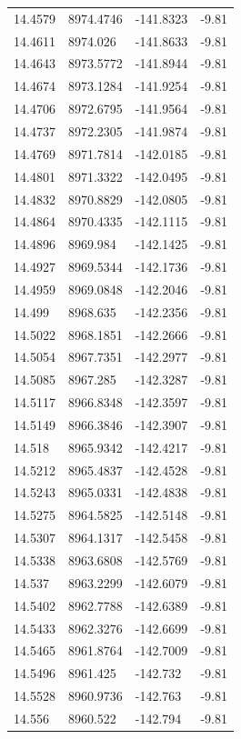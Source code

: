 \begin{table}[H]
\begin{tabular}{llll}
14.4579 & 8974.4746 & -141.8323 & -9.81 \\
14.4611 & 8974.026 & -141.8633 & -9.81 \\
14.4643 & 8973.5772 & -141.8944 & -9.81 \\
14.4674 & 8973.1284 & -141.9254 & -9.81 \\
14.4706 & 8972.6795 & -141.9564 & -9.81 \\
14.4737 & 8972.2305 & -141.9874 & -9.81 \\
14.4769 & 8971.7814 & -142.0185 & -9.81 \\
14.4801 & 8971.3322 & -142.0495 & -9.81 \\
14.4832 & 8970.8829 & -142.0805 & -9.81 \\
14.4864 & 8970.4335 & -142.1115 & -9.81 \\
14.4896 & 8969.984 & -142.1425 & -9.81 \\
14.4927 & 8969.5344 & -142.1736 & -9.81 \\
14.4959 & 8969.0848 & -142.2046 & -9.81 \\
14.499 & 8968.635 & -142.2356 & -9.81 \\
14.5022 & 8968.1851 & -142.2666 & -9.81 \\
14.5054 & 8967.7351 & -142.2977 & -9.81 \\
14.5085 & 8967.285 & -142.3287 & -9.81 \\
14.5117 & 8966.8348 & -142.3597 & -9.81 \\
14.5149 & 8966.3846 & -142.3907 & -9.81 \\
14.518 & 8965.9342 & -142.4217 & -9.81 \\
14.5212 & 8965.4837 & -142.4528 & -9.81 \\
14.5243 & 8965.0331 & -142.4838 & -9.81 \\
14.5275 & 8964.5825 & -142.5148 & -9.81 \\
14.5307 & 8964.1317 & -142.5458 & -9.81 \\
14.5338 & 8963.6808 & -142.5769 & -9.81 \\
14.537 & 8963.2299 & -142.6079 & -9.81 \\
14.5402 & 8962.7788 & -142.6389 & -9.81 \\
14.5433 & 8962.3276 & -142.6699 & -9.81 \\
14.5465 & 8961.8764 & -142.7009 & -9.81 \\
14.5496 & 8961.425 & -142.732 & -9.81 \\
14.5528 & 8960.9736 & -142.763 & -9.81 \\
14.556 & 8960.522 & -142.794 & -9.81 \\

\end{tabular}
\end{table}
